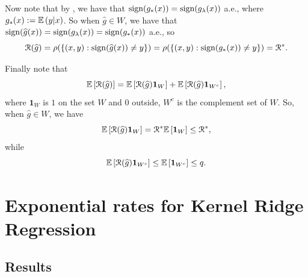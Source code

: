 Now note that by ,  we have that $\mathop{ \mathrm{sign}}(g_\ast(x)) = \mathop{ \mathrm{sign}}(g_\lambda(x))$ a.e., where $g_\ast(x):= \mathbb{E}\left({y}\middle|{x}\right)$. So when $\widehat{g} \in W$, we have that $\mathop{ \mathrm{sign}}(\widehat{g}(x)) = \mathop{ \mathrm{sign}}(g_\lambda(x)) = \mathop{ \mathrm{sign}}(g_\ast(x))$ a.e., so
$$ {\cal R}(\widehat{g}) = \rho(\{(x,y): \mathop{ \mathrm{sign}}(\widehat{g}(x)) \neq y\}) =  \rho(\{(x,y): \mathop{ \mathrm{sign}}(g_\ast(x)) \neq y\}) = {\cal R}^*.$$

Finally note that
$$ \mathbb{E}\left[{{\cal R}(\widehat{g})}\right] = \mathbb{E}\left[{{\cal R}(\widehat{g}){\mathbf 1}_W}\right] + \mathbb{E}\left[{{\cal R}(\widehat{g}){\mathbf 1}_{W^c}}\right],$$
where ${\mathbf 1}_W$ is $1$ on the set $W$ and $0$ outside, $W^c$ is the complement set of $W$. 
So, when $\widehat{g} \in W$, we have
$$ \mathbb{E}\left[{{\cal R}(\widehat{g}){\mathbf 1}_W}\right] = {\cal R}^*\mathbb{E}\left[{{\mathbf 1}_W}\right] \leq {\cal R}^*,$$
while
$$\mathbb{E}\left[{{\cal R}(\widehat{g}){\mathbf 1}_{W^c}}\right] \leq \mathbb{E}\left[{{\mathbf 1}_{W^c}}\right] \leq q.$$
\epr

\section{Exponential rates for Kernel Ridge Regression}\label{sect:exp-rates-for-KRR}

\subsection{Results}

